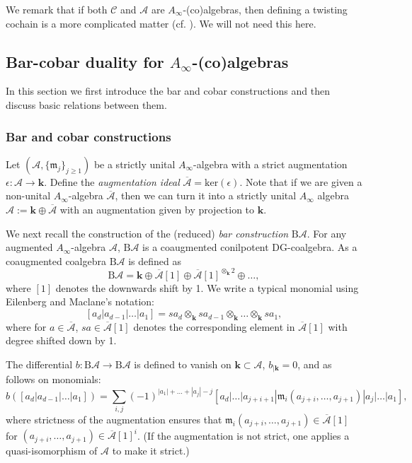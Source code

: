 \documentclass{gtpart}
\renewcommand{\k}{\mathbf{k}}
\newcommand{\m}{\mathfrak{m}}
\newcommand{\A}{\mathscr{A}}
\newcommand{\Abar}{\overline{\mathscr{A}}}
\renewcommand{\Bar}{\mathrm{B}}
\renewcommand{\C}{\mathscr{C}}
\begin{document}
We remark that if both $\C$ and $\A$ are $A_\infty$-(co)algebras, then defining a twisting
cochain is a more complicated matter (cf. \cite[Introduction]{proute}). We will not need this here.

\subsection{Bar-cobar duality for $A_\infty$-(co)algebras}
In this section we first introduce the bar and cobar constructions and then discuss basic relations between them.


\subsubsection{Bar and cobar constructions} 
\label{barcobarsec}
Let $(\A, \{\m_j\}_{j \geq 1})$ be a strictly unital $A_\infty$-algebra with a strict
augmentation $\epsilon\colon \A \to \k$. Define the \emph{augmentation ideal} $\Abar =\mathrm{ker}
(\epsilon)$. Note that if we are given a non-unital $A_\infty$-algebra $\Abar$, then we can turn it into a strictly unital
$A_\infty$ algebra $\A := \k \oplus \Abar$ with an augmentation given by projection to $\k$. 

We next recall the construction of the (reduced) \emph{bar construction} $\Bar \A$. For any augmented $A_\infty$-algebra $\A$, $\Bar \A$ is a coaugmented conilpotent DG-coalgebra. As a coaugmented coalgebra $\Bar \A$ is defined as
\[ 
\Bar \A = \k \oplus \Abar [1] \oplus \Abar [1]^{\otimes_\k 2} \oplus \ldots,  
\]
where $[1]$ denotes the downwards shift by 1. We write a typical monomial using Eilenberg and
Maclane's notation: \[ [a_d|a_{d-1}|\ldots |a_1] = sa_d \otimes_\k sa_{d-1} \otimes_\k \ldots
\otimes_\k sa_1, \]
where for $a \in \Abar$, $sa \in \Abar[1]$ denotes the corresponding element in $\Abar[1]$ with degree shifted down by 1. 

The differential $b\colon \Bar \A \to \Bar \A$ is defined to vanish on $\k\subset\A$, $b_{|\k}=0$, and as follows on monomials:
\[ 
b([a_d|a_{d-1}|\ldots|a_1]) = \sum_{i,j} (-1)^{|a_1|+\ldots+|a_j|-j}
[a_d|\ldots|a_{j+i+1}|\m_i(a_{j+i},\ldots,a_{j+1})|a_{j}|\ldots|a_1], 
\]
where strictness of the augmentation ensures that $\m_i(a_{j+i},\ldots, a_{j+1}) \in \Abar[1]$ for
$(a_{j+i},\ldots, a_{j+1}) \in \Abar[1]^{i}$. (If the augmentation is not strict, one applies a quasi-isomorphism of $\A$ to make it strict.) 
\end{document}
